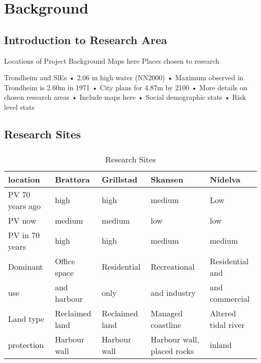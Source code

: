 \chapter{Background}

\section{Introduction to Research Area}

Locations of Project Background
Maps here
Places chosen to research 

Trondheim and SlEs
•	2.06 m high water (NN2000)
•	Maximum observed in Trondheim is 2.60m in 1971
•	City plans for 4.87m by 2100
•	More details on chosen research areas
•	Include maps here 
•	Social demographic stats
•	Risk level stats

\section{Research Sites}

\paragraph{}
\begin{table}[!ht]
    \centering
    \begin{tabular}{|l|l|l|l|l|}
    \hline
        location & Brattøra & Grillstad & Skansen  & Nidelva \\ \hline
        PV 70 years ago & high & high & medium & Low \\ \hline
        PV now &  medium &  medium &  low &  low \\ \hline
        PV in 70 years &  high &  high &  medium &  medium \\ \hline
        Dominant & Office space  & Residential & Recreational  & Residential and \\ \newline
        use & and harbour &  only   &  and industry & and commercial  \\ \hline
        Land type & Reclaimed land & Reclaimed land & Managed coastline  & Altered tidal river \\ \hline
        protection & Harbour wall & Harbour wall & Harbour wall, placed rocks & inland \\ \hline
    \end{tabular}
    \caption{Research Sites}
    \label{table:research-sites}
\end{table}

